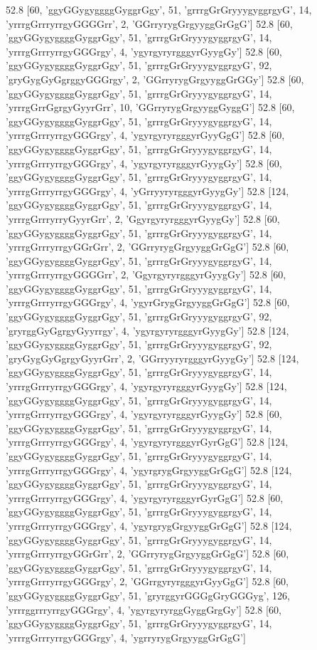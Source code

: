 52.8 [60, 'ggyGGygyggggGyggrGgy', 51, 'grrrgGrGryyygyggrgyG', 14, 'yrrrgGrrryrrgyGGGGrr', 2, 'GGrryrygGrgyyggGrGgG']
52.8 [60, 'ggyGGygyggggGyggrGgy', 51, 'grrrgGrGryyygyggrgyG', 14, 'yrrrgGrrryrrgyGGGrgy', 4, 'ygyrgyryrgggyrGyygGy']
52.8 [60, 'ggyGGygyggggGyggrGgy', 51, 'grrrgGrGryyygyggrgyG', 92, 'gryGygGyGgrggyGGGrgy', 2, 'GGrryrygGrgyyggGrGGy']
52.8 [60, 'ggyGGygyggggGyggrGgy', 51, 'grrrgGrGryyygyggrgyG', 14, 'yrrrgGrrGgrgyGyyrGrr', 10, 'GGrryrygGrgyyggGyggG']
52.8 [60, 'ggyGGygyggggGyggrGgy', 51, 'grrrgGrGryyygyggrgyG', 14, 'yrrrgGrrryrrgyGGGrgy', 4, 'ygyrgyryrgggyrGyyGgG']
52.8 [60, 'ggyGGygyggggGyggrGgy', 51, 'grrrgGrGryyygyggrgyG', 14, 'yrrrgGrrryrrgyGGGrgy', 4, 'ygyrgyryrgggyrGyygGy']
52.8 [60, 'ggyGGygyggggGyggrGgy', 51, 'grrrgGrGryyygyggrgyG', 14, 'yrrrgGrrryrrgyGGGrgy', 4, 'yGrryyryrgggyrGyygGy']
52.8 [124, 'ggyGGygyggggGyggrGgy', 51, 'grrrgGrGryyygyggrgyG', 14, 'yrrrgGrrryrryGyyrGrr', 2, 'GgyrgyryrgggyrGyygGy']
52.8 [60, 'ggyGGygyggggGyggrGgy', 51, 'grrrgGrGryyygyggrgyG', 14, 'yrrrgGrrryrrgyGGrGrr', 2, 'GGrryrygGrgyyggGrGgG']
52.8 [60, 'ggyGGygyggggGyggrGgy', 51, 'grrrgGrGryyygyggrgyG', 14, 'yrrrgGrrryrrgyGGGGrr', 2, 'GgyrgyryrgggyrGyygGy']
52.8 [60, 'ggyGGygyggggGyggrGgy', 51, 'grrrgGrGryyygyggrgyG', 14, 'yrrrgGrrryrrgyGGGrgy', 4, 'ygyrGrygGrgyyggGrGgG']
52.8 [60, 'ggyGGygyggggGyggrGgy', 51, 'grrrgGrGryyygyggrgyG', 92, 'gryrggGyGgrgyGyyrrgy', 4, 'ygyrgyryrgggyrGyygGy']
52.8 [124, 'ggyGGygyggggGyggrGgy', 51, 'grrrgGrGryyygyggrgyG', 92, 'gryGygGyGgrgyGyyrGrr', 2, 'GGrryyryrgggyrGyygGy']
52.8 [124, 'ggyGGygyggggGyggrGgy', 51, 'grrrgGrGryyygyggrgyG', 14, 'yrrrgGrrryrrgyGGGrgy', 4, 'ygyrgyryrgggyrGyygGy']
52.8 [124, 'ggyGGygyggggGyggrGgy', 51, 'grrrgGrGryyygyggrgyG', 14, 'yrrrgGrrryrrgyGGGrgy', 4, 'ygyrgyryrgggyrGyygGy']
52.8 [60, 'ggyGGygyggggGyggrGgy', 51, 'grrrgGrGryyygyggrgyG', 14, 'yrrrgGrrryrrgyGGGrgy', 4, 'ygyrgyryrgggyrGyrGgG']
52.8 [124, 'ggyGGygyggggGyggrGgy', 51, 'grrrgGrGryyygyggrgyG', 14, 'yrrrgGrrryrrgyGGGrgy', 4, 'ygyrgrygGrgyyggGrGgG']
52.8 [124, 'ggyGGygyggggGyggrGgy', 51, 'grrrgGrGryyygyggrgyG', 14, 'yrrrgGrrryrrgyGGGrgy', 4, 'ygyrgyryrgggyrGyrGgG']
52.8 [60, 'ggyGGygyggggGyggrGgy', 51, 'grrrgGrGryyygyggrgyG', 14, 'yrrrgGrrryrrgyGGGrgy', 4, 'ygyrgrygGrgyyggGrGgG']
52.8 [124, 'ggyGGygyggggGyggrGgy', 51, 'grrrgGrGryyygyggrgyG', 14, 'yrrrgGrrryrrgyGGrGrr', 2, 'GGrryrygGrgyyggGrGgG']
52.8 [60, 'ggyGGygyggggGyggrGgy', 51, 'grrrgGrGryyygyggrgyG', 14, 'yrrrgGrrryrrgyGGGrgy', 2, 'GGrrgyryrgggyrGyyGgG']
52.8 [60, 'ggyGGygyggggGyggrGgy', 51, 'gryrggyrGGGgGryGGGyg', 126, 'yrrrggrrryrrgyGGGrgy', 4, 'ygyrgyryrggGyggGrgGy']
52.8 [60, 'ggyGGygyggggGyggrGgy', 51, 'grrrgGrGryyygyggrgyG', 14, 'yrrrgGrrryrrgyGGGrgy', 4, 'ygrryrygGrgyyggGrGgG']
